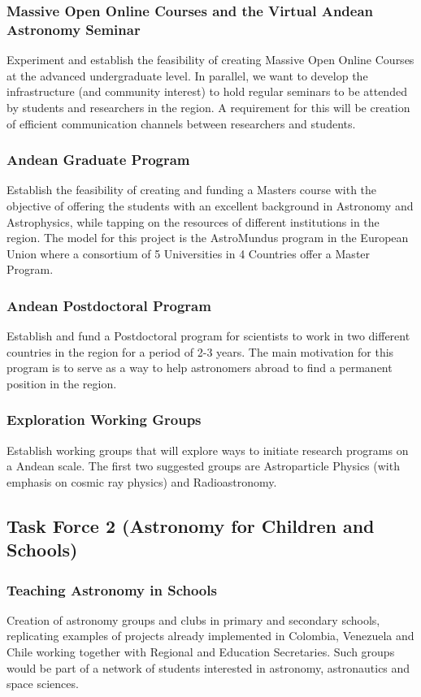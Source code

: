\documentclass[12pt]{article}
\begin{document}
\subsubsection*{Massive Open Online Courses and the Virtual Andean
  Astronomy Seminar} 
Experiment and establish the feasibility of creating Massive Open
Online Courses at the advanced undergraduate level. In parallel, we
want to develop the infrastructure (and community interest) to hold
regular seminars to be attended by students and researchers in the
region. A requirement for this will be creation of efficient
communication channels between researchers and students. 

\subsubsection*{Andean Graduate Program}
Establish the feasibility of creating and funding a Masters course
with the objective of offering the students with an excellent
background in Astronomy and Astrophysics, while tapping on the
resources of different institutions in the region. The model for this
project is the AstroMundus program in the European Union where a
consortium of 5 Universities in 4 Countries offer a Master Program. 

\subsubsection*{Andean Postdoctoral Program}
Establish and fund a Postdoctoral program for scientists to work in
two different countries in the region for a period of 2-3 years. The
main motivation for this program is to serve as a way to help
astronomers abroad to find a permanent position in the region. 

\subsubsection*{Exploration Working Groups}
Establish working groups that will explore ways to initiate research
programs on a Andean scale. The first two suggested groups are
Astroparticle Physics (with emphasis on cosmic ray physics) and
Radioastronomy. 

\subsection{Task Force 2 (Astronomy for Children and Schools)}


\subsubsection*{Teaching Astronomy in Schools}
Creation of astronomy groups and clubs  in primary  and secondary
schools, replicating examples of projects already implemented in
Colombia, Venezuela and Chile  working together with Regional and
Education Secretaries. Such groups would be part of a network of
students  interested in astronomy, astronautics and space sciences.  
\end{document}

